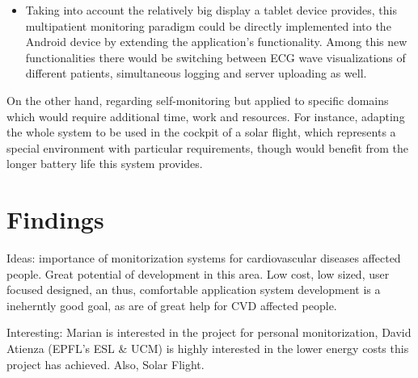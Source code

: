 \begin{itemize}
\begin{itemize}
					\item Taking into account the relatively big display a tablet device provides, this
						multipatient monitoring paradigm could be directly implemented into the Android 
						device by extending the application's functionality. Among this new functionalities
						there would be switching between ECG wave visualizations of different patients,
						simultaneous logging and server uploading as well.
				\end{itemize}

				On the other hand, regarding self-monitoring but applied to specific domains which would
				require additional time, work and resources. For instance, adapting the whole system to be used
				in the cockpit of a solar flight, which represents a special environment with particular
				requirements, though would benefit from the longer battery life this system provides.
		\end{itemize}
	
	\section{Findings}
	\label{sec:end-findings}

		Ideas: importance of monitorization systems for cardiovascular diseases affected people. Great potential of development in this area. Low cost, low sized, user focused designed, an thus, comfortable application system development is a ineherntly good goal, as are of great help for CVD affected people.

		Interesting: Marian is interested in the project for personal monitorization, David Atienza (EPFL's ESL \& UCM) is highly interested in the lower energy costs this project has achieved. Also, Solar Flight.
